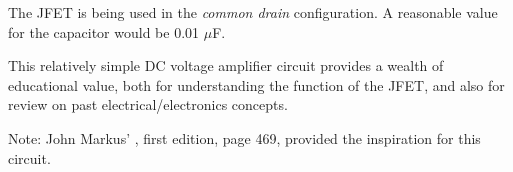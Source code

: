 The JFET is being used in the {\it common drain} configuration.  A reasonable value for the capacitor would be 0.01 $\mu$F.







This relatively simple DC voltage amplifier circuit provides a wealth of educational value, both for understanding the function of the JFET, and also for review on past electrical/electronics concepts.

Note: John Markus' , first edition, page 469, provided the inspiration for this circuit.




